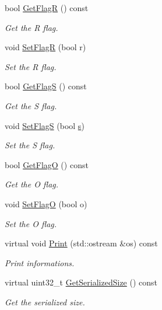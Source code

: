 \begin{DoxyCompactItemize}
bool \hyperlink{classns3_1_1Icmpv6NA_a6219dff963f9108a8167be5825950a50}{Get\+FlagR} () const 
\begin{DoxyCompactList}\small\item\em Get the R flag. \end{DoxyCompactList}\item 
void \hyperlink{classns3_1_1Icmpv6NA_a7acfe211ef090061749eb878286e9325}{Set\+FlagR} (bool r)
\begin{DoxyCompactList}\small\item\em Set the R flag. \end{DoxyCompactList}\item 
bool \hyperlink{classns3_1_1Icmpv6NA_a34e892920f1c4c86368e5bf188bd733e}{Get\+FlagS} () const 
\begin{DoxyCompactList}\small\item\em Get the S flag. \end{DoxyCompactList}\item 
void \hyperlink{classns3_1_1Icmpv6NA_a52d07aa59b79c381b0767e52941b3e22}{Set\+FlagS} (bool \hyperlink{generate__test__data__lte__sinr_8m_ad83eeb3a142285d1243a08c6b7026df8}{s})
\begin{DoxyCompactList}\small\item\em Set the S flag. \end{DoxyCompactList}\item 
bool \hyperlink{classns3_1_1Icmpv6NA_a2adca409a6a437dbcf85c53fcb02fac6}{Get\+FlagO} () const 
\begin{DoxyCompactList}\small\item\em Get the O flag. \end{DoxyCompactList}\item 
void \hyperlink{classns3_1_1Icmpv6NA_aaff2ebe01f4ca803134f8a7d527b7613}{Set\+FlagO} (bool o)
\begin{DoxyCompactList}\small\item\em Set the O flag. \end{DoxyCompactList}\item 
virtual void \hyperlink{classns3_1_1Icmpv6NA_a9bdb16d7812492de3caecea50a084082}{Print} (std\+::ostream \&os) const 
\begin{DoxyCompactList}\small\item\em Print informations. \end{DoxyCompactList}\item 
virtual uint32\+\_\+t \hyperlink{classns3_1_1Icmpv6NA_a5acf64b1c597a8298ea9ee05f56303d4}{Get\+Serialized\+Size} () const 
\begin{DoxyCompactList}\small\item\em Get the serialized size. \end{DoxyCompactList}\item 

\end{DoxyCompactItemize}
